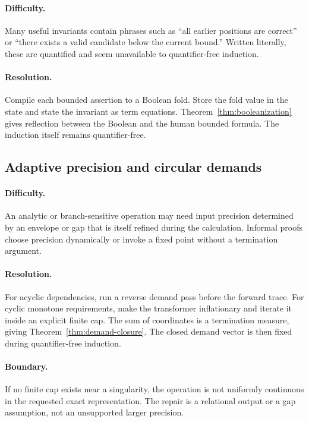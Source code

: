 \paragraph{Difficulty.}
Many useful invariants contain phrases such as ``all earlier positions are correct'' or ``there exists a
valid candidate below the current bound.''  Written literally, these are quantified and seem unavailable to
quantifier-free induction.

\paragraph{Resolution.}
Compile each bounded assertion to a Boolean fold.  Store the fold value in the state and state the invariant
as term equations.  Theorem~\ref{thm:booleanization} gives reflection between the Boolean and the human
bounded formula.  The induction itself remains quantifier-free.

\subsection{Adaptive precision and circular demands}

\paragraph{Difficulty.}
An analytic or branch-sensitive operation may need input precision determined by an envelope or gap that is
itself refined during the calculation.  Informal proofs choose precision dynamically or invoke a fixed point
without a termination argument.

\paragraph{Resolution.}
For acyclic dependencies, run a reverse demand pass before the forward trace.  For cyclic monotone
requirements, make the transformer inflationary and iterate it inside an explicit finite cap.  The sum of
coordinates is a termination measure, giving Theorem~\ref{thm:demand-closure}.  The closed demand vector is
then fixed during quantifier-free induction.

\paragraph{Boundary.}
If no finite cap exists near a singularity, the operation is not uniformly continuous in the requested
exact representation.  The repair is a relational output or a gap assumption, not an unsupported larger
precision.

